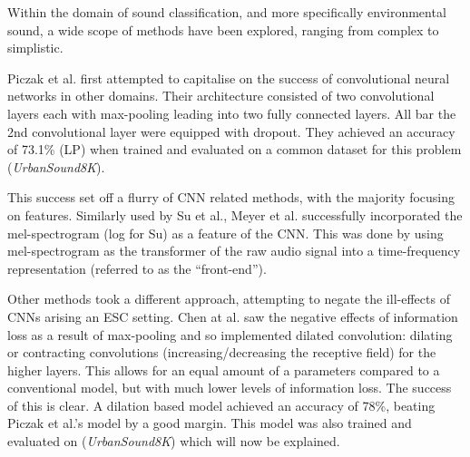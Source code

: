 \documentclass[conference]{IEEEtran}
\begin{document}
Within the domain of sound classification, and more specifically environmental sound, a wide scope of methods have been explored, ranging from complex to simplistic.

Piczak et al. \cite{piczak} first attempted to capitalise on the success of convolutional neural networks in other domains. Their architecture consisted of two convolutional layers each with max-pooling leading into two fully connected layers. All bar the 2nd convolutional layer were equipped with dropout. They achieved an accuracy of 73.1\% (LP) when trained and evaluated on a common dataset for this problem (\textit{UrbanSound8K}).

This success set off a flurry of CNN related methods, with the majority focusing on features. Similarly used by Su et al., Meyer et al. \cite{meyer} successfully incorporated the mel-spectrogram (log for Su) as a feature of the CNN. This was done by using mel-spectrogram as the transformer of the raw audio signal into a time-frequency representation (referred to as the ``front-end'').

Other methods took a different approach, attempting to negate the ill-effects of CNNs arising an ESC setting. Chen at al. \cite{chen} saw the negative effects of information loss as a result of max-pooling and so implemented dilated convolution: dilating or contracting convolutions (increasing/decreasing the receptive field) for the higher layers. This allows for an equal amount of a parameters compared to a conventional model, but with much lower levels of information loss. The success of this is clear. A dilation based model achieved an accuracy of 78\%, beating Piczak et al.'s model by a good margin. 
This model was also trained and evaluated on (\textit{UrbanSound8K}) which will now be explained.

\end{document}

